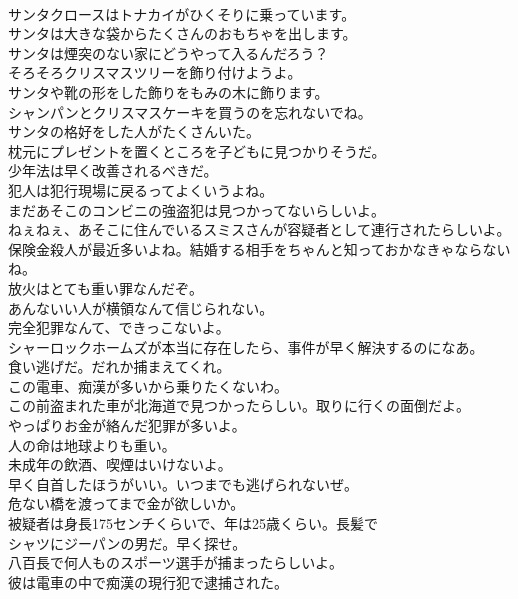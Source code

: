 \documentclass[8pt]{extreport}
\begin{document}
\begin{CJK}{UTF8}{min}
\\	サンタクロースはトナカイがひくそりに乗っています。	
\\	サンタは大きな袋からたくさんのおもちゃを出します。	
\\	サンタは煙突のない家にどうやって入るんだろう？	
\\	そろそろクリスマスツリーを飾り付けようよ。	
\\	サンタや靴の形をした飾りをもみの木に飾ります。	
\\	シャンパンとクリスマスケーキを買うのを忘れないでね。	
\\	サンタの格好をした人がたくさんいた。	
\\	枕元にプレゼントを置くところを子どもに見つかりそうだ。	
\\	少年法は早く改善されるべきだ。	
\\	犯人は犯行現場に戻るってよくいうよね。	
\\	まだあそこのコンビニの強盗犯は見つかってないらしいよ。	
\\	ねぇねぇ、あそこに住んでいるスミスさんが容疑者として連行されたらしいよ。	
\\	保険金殺人が最近多いよね。結婚する相手をちゃんと知っておかなきゃならないね。	
\\	放火はとても重い罪なんだぞ。	
\\	あんないい人が横領なんて信じられない。	
\\	完全犯罪なんて、できっこないよ。	
\\	シャーロックホームズが本当に存在したら、事件が早く解決するのになあ。	
\\	食い逃げだ。だれか捕まえてくれ。	
\\	この電車、痴漢が多いから乗りたくないわ。	
\\	この前盗まれた車が北海道で見つかったらしい。取りに行くの面倒だよ。	
\\	やっぱりお金が絡んだ犯罪が多いよ。	
\\	人の命は地球よりも重い。	
\\	未成年の飲酒、喫煙はいけないよ。	
\\	早く自首したほうがいい。いつまでも逃げられないぜ。	
\\	危ない橋を渡ってまで金が欲しいか。	
\\	被疑者は身長175センチくらいで、年は25歳くらい。長髪で
\\	シャツにジーパンの男だ。早く探せ。	
\\	八百長で何人ものスポーツ選手が捕まったらしいよ。	
\\	彼は電車の中で痴漢の現行犯で逮捕された。	

\end{CJK}
\end{document}
